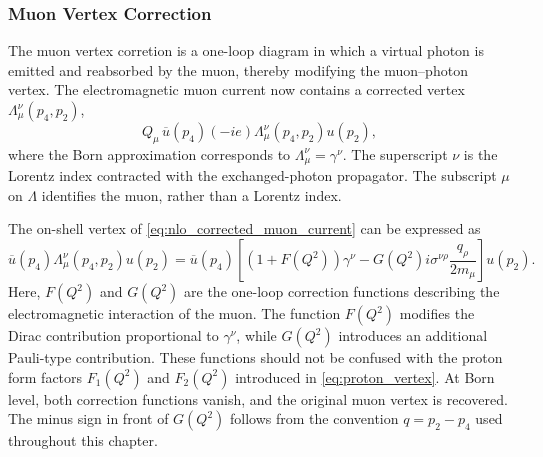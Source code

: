 \subsubsection{Muon Vertex Correction}
The muon vertex corretion is a one-loop diagram in which a virtual photon is emitted and reabsorbed by the muon, thereby modifying the muon--photon vertex. The electromagnetic muon current now contains a corrected vertex $\Lambda^\nu_\mu(p_4,p_2)$,
\begin{equation}
  Q_\mu\,\overline{u}(p_4)(-ie)\Lambda^\nu_\mu(p_4,p_2)u(p_2),
  \label{eq:nlo_corrected_muon_current}
\end{equation}
where the Born approximation corresponds to $\Lambda^\nu_\mu=\gamma^\nu$. The superscript $\nu$ is the Lorentz index contracted with the exchanged-photon propagator. The subscript $\mu$ on $\Lambda$ identifies the muon, rather than a Lorentz index.

The on-shell vertex of \autoref{eq:nlo_corrected_muon_current} can be expressed as
\begin{equation}
  \overline{u}(p_4)\Lambda^\nu_\mu(p_4,p_2)u(p_2)
  =\overline{u}(p_4)\left[(1+F(Q^2))\gamma^\nu-G(Q^2)i\sigma^{\nu\rho}\frac{q_\rho}{2m_\mu}\right]u(p_2).
\end{equation}
Here, \(F(Q^2)\) and \(G(Q^2)\) are the one-loop correction functions describing the electromagnetic interaction of the muon. The function \(F(Q^2)\) modifies the Dirac contribution proportional to \(\gamma^\nu\), while \(G(Q^2)\) introduces an additional Pauli-type contribution. These functions should not be confused with the proton form factors \(F_1(Q^2)\) and \(F_2(Q^2)\) introduced in \autoref{eq:proton_vertex}. At Born level, both correction functions vanish, and the original muon vertex is recovered. The minus sign in front of $G(Q^2)$ follows from the convention $q=p_2-p_4$ used throughout this chapter.

